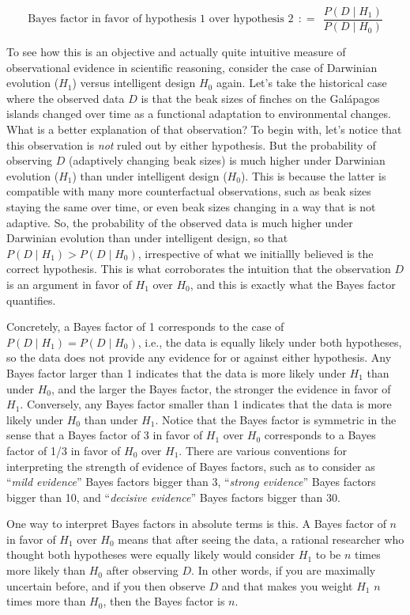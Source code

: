 \documentclass[
  doc,
  floatsintext,
  longtable,
  nolmodern,
  notxfonts,
  notimes,
  colorlinks=true,linkcolor=blue,citecolor=blue,urlcolor=blue]{apa7}
\begin{document}
\[
\text{Bayes factor in favor of hypothesis 1 over hypothesis 2} \ \  \colon\!= \ \ \frac{P(D \mid H_1)}{P(D \mid H_0)}
\]

To see how this is an objective and actually quite intuitive measure of
observational evidence in scientific reasoning, consider the case of
Darwinian evolution (\(H_1\)) versus intelligent design \(H_0\) again.
Let's take the historical case where the observed data \(D\) is that the
beak sizes of finches on the Galápagos islands changed over time as a
functional adaptation to environmental changes. What is a better
explanation of that observation? To begin with, let's notice that this
observation is \emph{not} ruled out by either hypothesis. But the
probability of observing \(D\) (adaptively changing beak sizes) is much
higher under Darwinian evolution (\(H_1\)) than under intelligent design
(\(H_0\)). This is because the latter is compatible with many more
counterfactual observations, such as beak sizes staying the same over
time, or even beak sizes changing in a way that is not adaptive. So, the
probability of the observed data is much higher under Darwinian
evolution than under intelligent design, so that
\(P(D \mid H_1) > P(D \mid H_0)\), irrespective of what we initiallly
believed is the correct hypothesis. This is what corroborates the
intuition that the observation \(D\) is an argument in favor of \(H_1\)
over \(H_0\), and this is exactly what the Bayes factor quantifies.

Concretely, a Bayes factor of 1 corresponds to the case of
\(P(D \mid H_1) = P(D \mid H_0)\), i.e., the data is equally likely
under both hypotheses, so the data does not provide any evidence for or
against either hypothesis. Any Bayes factor larger than 1 indicates that
the data is more likely under \(H_1\) than under \(H_0\), and the larger
the Bayes factor, the stronger the evidence in favor of \(H_1\).
Conversely, any Bayes factor smaller than 1 indicates that the data is
more likely under \(H_0\) than under \(H_1\). Notice that the Bayes
factor is symmetric in the sense that a Bayes factor of 3 in favor of
\(H_1\) over \(H_0\) corresponds to a Bayes factor of 1/3 in favor of
\(H_0\) over \(H_1\). There are various conventions for interpreting the
strength of evidence of Bayes factors, such as to consider as
``\emph{mild evidence}'' Bayes factors bigger than 3, ``\emph{strong
evidence}'' Bayes factors bigger than 10, and ``\emph{decisive
evidence}'' Bayes factors bigger than 30.

One way to interpret Bayes factors in absolute terms is this. A Bayes
factor of \(n\) in favor of \(H_1\) over \(H_0\) means that after seeing
the data, a rational researcher who thought both hypotheses were equally
likely would consider \(H_1\) to be \(n\) times more likely than \(H_0\)
after observing \(D\). In other words, if you are maximally uncertain
before, and if you then observe \(D\) and that makes you weight \(H_1\)
\(n\) times more than \(H_0\), then the Bayes factor is \(n\).
\end{document}
